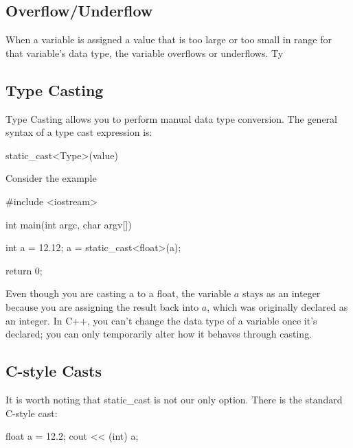 \documentclass{report}
\begin{document}
    \bigbreak \noindent 
    \subsection{Overflow/Underflow}
    \bigbreak \noindent 
    \begin{concept}
 When a variable is assigned a value that is too large or too small in range for that variable's data type, the variable overflows or underflows. Ty
	\end{concept}
    \bigbreak \noindent 
    
    \bigbreak \noindent 
    \subsection{Type Casting}
    \bigbreak \noindent 
    \begin{concept}
 Type Casting allows you to perform manual data type conversion. The general syntax of a type cast expression is:
	\end{concept}
    \bigbreak \noindent 
    
    \begin{cppcode}
static_cast<Type>(value)
    \end{cppcode}
    
    \bigbreak \noindent 
    Consider the example
    \smallbreak \noindent
    
    \begin{cppcode}
#include <iostream>

int main(int argc, char argv[]){
    int a = 12.12;
    a = static_cast<float>(a);

    return 0;
}
    \end{cppcode}
    
    \bigbreak \noindent 
    Even though you are casting a to a float, the variable $a$ stays as an integer because you are assigning the result back into $a$, which was originally declared as an integer. In C++, you can't change the data type of a variable once it's declared; you can only temporarily alter how it behaves through casting.

    \bigbreak \noindent 
    \subsection{C-style Casts}
    \bigbreak \noindent 
    It is worth noting that static\_cast is not our only option. There is the standard C-style cast:
    \bigbreak \noindent 
    
    \begin{cppcode}
float a = 12.2;
cout << (int) a;
    \end{cppcode}
    
\end{document}

